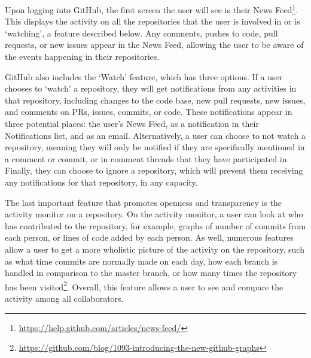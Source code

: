 Upon logging into GitHub, the first screen the user will see is their News Feed\footnote{\url{https://help.github.com/articles/news-feed/}}. This displays the activity on all the repositories that the user is involved in or is `watching', a feature described below. Any comments, pushes to code, pull requests, or new issues appear in the News Feed, allowing the user to be aware of the events happening in their repositories.

GitHub also includes the `Watch' feature, which has three options. If a user chooses to `watch' a repository, they will get notifications from any activities in that repository, including changes to the code base, new pull requests, new issues, and comments on PRs, issues, commits, or code. These notifications appear in three potential places: the user's News Feed, as a notification in their Notifications list, and as an email. Alternatively, a user can choose to not watch a repository, meaning they will only be notified if they are specifically mentioned in a comment or commit, or in comment threads that they have participated in. Finally, they can choose to ignore a repository, which will prevent them receiving any notifications for that repository, in any capacity.

The last important feature that promotes openness and transparency is the activity monitor on a repository. On the activity monitor, a user can look at who has contributed to the repository, for example, graphs of number of commits from each person, or lines of code added by each person. As well, numerous features allow a user to get a more wholistic picture of the activity on the repository, such as what time commits are normally made on each day, how each branch is handled in comparison to the master branch, or how many times the repository has been visited\footnote{\url{https://github.com/blog/1093-introducing-the-new-github-graphs}}. Overall, this feature allows a user to see and compare the activity among all collaborators.

